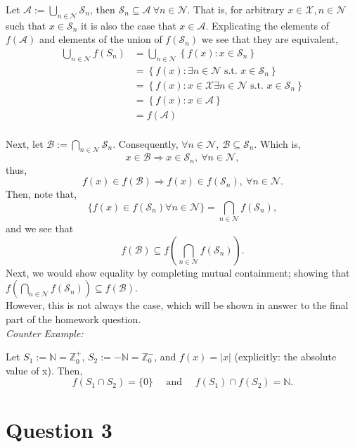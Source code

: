 \documentclass[12 pt,letterpaper]{article}
\newcommand{\abs}[1]{|{#1}|}
\begin{document}
Let \(\mathcal{A} := \bigcup_{n\in\mathcal{N}} \mathcal{S}_n\), 
then \(\mathcal{S}_n \subseteq \mathcal{A}\ \forall n\in\mathcal{N}\).
That is, for arbitrary \(x\in\mathcal{X}, n\in\mathcal{N}\) such that 
\(x\in\mathcal{S}_n\) it is also the case that \(x\in\mathcal{A}\).
Explicating the elements of \(f(\mathcal{A})\) and elements of the union of \(f(\mathcal{S}_n)\)
we see that they are equivalent,
\begin{align*}
    \bigcup_{n\in\mathcal{N}} f(S_n) 
    &= \bigcup_{n\in\mathcal{N}} \left\{f(x): x\in\mathcal{S}_n \right\} \\
    &= \left\{f(x): \exists n\in\mathcal{N}\text{ s.t. }x\in\mathcal{S}_n\right\} \\
    &= \left\{f(x): x\in\mathcal{X}\exists n\in\mathcal{N}\text{ s.t. }x\in\mathcal{S}_n\right\} \\
    &= \left\{f(x): x\in\mathcal{A} \right\} \\
    &= f(\mathcal{A})
\end{align*}
\\
Next, let \(\mathcal{B} := \bigcap_{n\in\mathcal{N}} \mathcal{S}_n\).
Consequently, \(\forall n\in\mathcal{N},\ \mathcal{B} \subseteq \mathcal{S}_n\).
Which is, \[x\in\mathcal{B} \Rightarrow x\in\mathcal{S}_n,\ \forall n\in\mathcal{N},\]
thus, \[f(x)\in f(\mathcal{B}) \Rightarrow f(x)\in f(\mathcal{S}_n),\ \forall n\in\mathcal{N}.\]
Then, note that,
\[
    \{f(x)\in f(\mathcal{S}_n) \forall n\in\mathcal{N}\}
    = \bigcap_{n\in\mathcal{N}} f(\mathcal{S}_n),
\]
and we see that 
\[f(\mathcal{B}) \subseteq f(\bigcap_{n\in\mathcal{N}} f(\mathcal{S}_n)).\]
Next, we would show equality by completing mutual containment; showing that
\(f(\bigcap_{n\in\mathcal{N}} f(\mathcal{S}_n)) \subseteq f(\mathcal{B})\).
\\
However, this is not always the case, which will be shown in answer to the 
final part of the homework question.
\\[2em]
\emph{Counter Example:}

Let \(S_1:=\mathbb{N}=\mathbb{Z}^+_0\), \(S_2:=-\mathbb{N}=\mathbb{Z}^-_0\), and \(f(x) = \abs{x}\) 
(explicitly: the absolute value of x).
Then,
\[f(S_1\cap S_2) = \{0\} \quad \text{ and } \quad f(S_1)\cap f(S_2) = \mathbb{N} .\]


\clearpage
\section*{Question 3}

\setcounter{section}{3}
\end{document}

